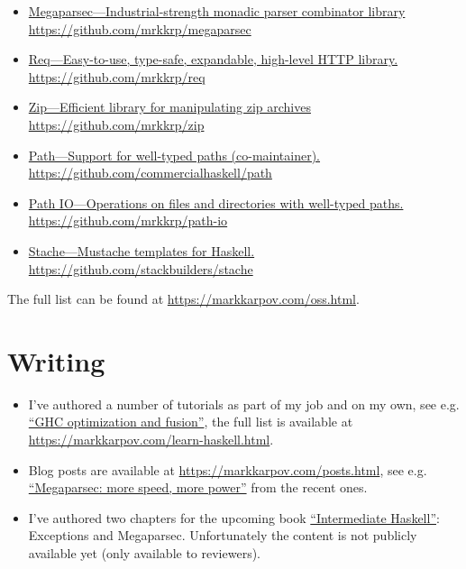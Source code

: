 \documentclass[a4paper,12pt]{article}
\begin{document}
\begin{itemize}[noitemsep]
\item \href{https://github.com/mrkkrp/megaparsec}
  {Megaparsec---Industrial-strength monadic parser combinator library
    \newline
    https://github.com/mrkkrp/megaparsec}
\item \href{https://github.com/mrkkrp/req}
  {Req---Easy-to-use, type-safe, expandable, high-level HTTP library.
    \newline
    https://github.com/mrkkrp/req}
\item \href{https://github.com/mrkkrp/zip}
  {Zip---Efficient library for manipulating zip archives
    \newline
    https://github.com/mrkkrp/zip}
\item \href{https://github.com/commercialhaskell/path}
  {Path---Support for well-typed paths (co-maintainer).
    \newline
    https://github.com/commercialhaskell/path}
\item \href{https://github.com/mrkkrp/path-io}
  {Path IO---Operations on files and directories with well-typed paths.
    \newline
    https://github.com/mrkkrp/path-io}
\item \href{https://github.com/stackbuilders/stache}
  {Stache---Mustache templates for Haskell.
    \newline
    https://github.com/stackbuilders/stache}
\end{itemize}

The full list can be found at \href{https://markkarpov.com/oss.html}{https://markkarpov.com/oss.html}.

\section*{Writing}

\begin{itemize}[noitemsep]
\item I've authored a number of tutorials as part of my job and on my own,
  see e.g.
  \href{https://www.stackbuilders.com/tutorials/haskell/ghc-optimization-and-fusion/}{“GHC
    optimization and fusion”}, the full list is available at \\
  \href{https://markkarpov.com/learn-haskell.html}{https://markkarpov.com/learn-haskell.html}.
\item Blog posts are available at
  \href{https://markkarpov.com/posts.html}{https://markkarpov.com/posts.html},
  see e.g.
  \href{https://markkarpov.com/post/megaparsec-more-speed-more-power.html}{“Megaparsec:
    more speed, more power”} from the recent ones.
\item I've authored two chapters for the upcoming book
  \href{https://intermediatehaskell.com/}{“Intermediate Haskell”}:
  Exceptions and Megaparsec. Unfortunately the content is not publicly
  available yet (only available to reviewers).
\end{itemize}
\end{document}
